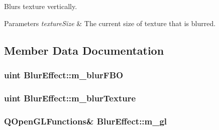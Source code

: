 Blurs texture vertically. 


\begin{DoxyParams}{Parameters}
{\em texture\+Size} & The current size of texture that is blurred. \\
\hline
\end{DoxyParams}


\subsection{Member Data Documentation}
\hypertarget{class_blur_effect_a3cf63e0dc804b038a9348923a5df12f5}{}
\subsubsection[{m\+\_\+blur\+F\+B\+O}]{\setlength{\rightskip}{0pt plus 5cm}uint Blur\+Effect\+::m\+\_\+blur\+F\+B\+O\hspace{0.3cm}{\ttfamily [protected]}}\label{class_blur_effect_a3cf63e0dc804b038a9348923a5df12f5}
\hypertarget{class_blur_effect_a8d3832820bc3cf08171d449cc0dc9430}{}
\subsubsection[{m\+\_\+blur\+Texture}]{\setlength{\rightskip}{0pt plus 5cm}uint Blur\+Effect\+::m\+\_\+blur\+Texture\hspace{0.3cm}{\ttfamily [protected]}}\label{class_blur_effect_a8d3832820bc3cf08171d449cc0dc9430}
\hypertarget{class_blur_effect_a60e476bb206ce650162006e19891f4e2}{}
\subsubsection[{m\+\_\+gl}]{\setlength{\rightskip}{0pt plus 5cm}Q\+Open\+G\+L\+Functions\& Blur\+Effect\+::m\+\_\+gl\hspace{0.3cm}{\ttfamily [protected]}}\label{class_blur_effect_a60e476bb206ce650162006e19891f4e2}
\hypertarget{class_blur_effect_abd260e17d64d3e819c9817e2ae92a33d}{}

